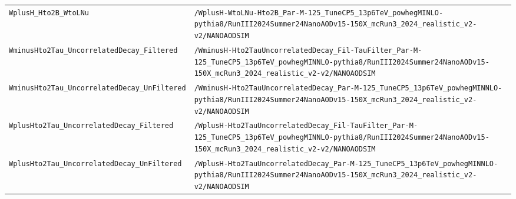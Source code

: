 \begin{longtable}{@{}>{\RaggedRight\arraybackslash}p{} >{\RaggedRight\arraybackslash}p{}@{}}
\addlinespace[2pt]
\texttt{WplusH\_\allowbreak{}Hto2B\_\allowbreak{}WtoLNu} & \texttt{/\allowbreak{}WplusH-\allowbreak{}WtoLNu-\allowbreak{}Hto2B\_\allowbreak{}Par-\allowbreak{}M-\allowbreak{}125\_\allowbreak{}TuneCP5\_\allowbreak{}13p6TeV\_\allowbreak{}powhegMINLO-\allowbreak{}pythia8/\allowbreak{}RunIII2024Summer24NanoAODv15-\allowbreak{}150X\_\allowbreak{}mcRun3\_\allowbreak{}2024\_\allowbreak{}realistic\_\allowbreak{}v2-\allowbreak{}v2/\allowbreak{}NANOAODSIM} \\
\addlinespace[2pt]
\texttt{WminusHto2Tau\_\allowbreak{}UncorrelatedDecay\_\allowbreak{}Filtered} & \texttt{/\allowbreak{}WminusH-\allowbreak{}Hto2TauUncorrelatedDecay\_\allowbreak{}Fil-\allowbreak{}TauFilter\_\allowbreak{}Par-\allowbreak{}M-\allowbreak{}125\_\allowbreak{}TuneCP5\_\allowbreak{}13p6TeV\_\allowbreak{}powhegMINNLO-\allowbreak{}pythia8/\allowbreak{}RunIII2024Summer24NanoAODv15-\allowbreak{}150X\_\allowbreak{}mcRun3\_\allowbreak{}2024\_\allowbreak{}realistic\_\allowbreak{}v2-\allowbreak{}v2/\allowbreak{}NANOAODSIM} \\
\addlinespace[2pt]
\texttt{WminusHto2Tau\_\allowbreak{}UncorrelatedDecay\_\allowbreak{}UnFiltered} & \texttt{/\allowbreak{}WminusH-\allowbreak{}Hto2TauUncorrelatedDecay\_\allowbreak{}Par-\allowbreak{}M-\allowbreak{}125\_\allowbreak{}TuneCP5\_\allowbreak{}13p6TeV\_\allowbreak{}powhegMINNLO-\allowbreak{}pythia8/\allowbreak{}RunIII2024Summer24NanoAODv15-\allowbreak{}150X\_\allowbreak{}mcRun3\_\allowbreak{}2024\_\allowbreak{}realistic\_\allowbreak{}v2-\allowbreak{}v2/\allowbreak{}NANOAODSIM} \\
\addlinespace[2pt]
\texttt{WplusHto2Tau\_\allowbreak{}UncorrelatedDecay\_\allowbreak{}Filtered} & \texttt{/\allowbreak{}WplusH-\allowbreak{}Hto2TauUncorrelatedDecay\_\allowbreak{}Fil-\allowbreak{}TauFilter\_\allowbreak{}Par-\allowbreak{}M-\allowbreak{}125\_\allowbreak{}TuneCP5\_\allowbreak{}13p6TeV\_\allowbreak{}powhegMINNLO-\allowbreak{}pythia8/\allowbreak{}RunIII2024Summer24NanoAODv15-\allowbreak{}150X\_\allowbreak{}mcRun3\_\allowbreak{}2024\_\allowbreak{}realistic\_\allowbreak{}v2-\allowbreak{}v2/\allowbreak{}NANOAODSIM} \\
\addlinespace[2pt]
\texttt{WplusHto2Tau\_\allowbreak{}UncorrelatedDecay\_\allowbreak{}UnFiltered} & \texttt{/\allowbreak{}WplusH-\allowbreak{}Hto2TauUncorrelatedDecay\_\allowbreak{}Par-\allowbreak{}M-\allowbreak{}125\_\allowbreak{}TuneCP5\_\allowbreak{}13p6TeV\_\allowbreak{}powhegMINNLO-\allowbreak{}pythia8/\allowbreak{}RunIII2024Summer24NanoAODv15-\allowbreak{}150X\_\allowbreak{}mcRun3\_\allowbreak{}2024\_\allowbreak{}realistic\_\allowbreak{}v2-\allowbreak{}v2/\allowbreak{}NANOAODSIM} \\

\end{longtable}
